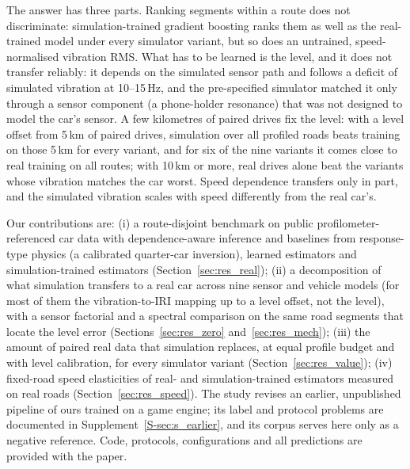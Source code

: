 The answer has three parts.
Ranking segments within a route does not discriminate: simulation-trained gradient boosting ranks them as well as the real-trained model under every simulator variant, but so does an untrained, speed-normalised vibration RMS.
What has to be learned is the level, and it does not transfer reliably: it depends on the simulated sensor path and follows a deficit of simulated vibration at 10--15\,Hz, and the pre-specified simulator matched it only through a sensor component (a phone-holder resonance) that was not designed to model the car's sensor.
A few kilometres of paired drives fix the level: with a level offset from 5\,km of paired drives, simulation over all profiled roads beats training on those 5\,km for every variant, and for six of the nine variants it comes close to real training on all routes; with 10\,km or more, real drives alone beat the variants whose vibration matches the car worst.
Speed dependence transfers only in part, and the simulated vibration scales with speed differently from the real car's.

Our contributions are:
(i) a route-disjoint benchmark on public profilometer-referenced car data with dependence-aware inference and baselines from response-type physics (a calibrated quarter-car inversion), learned estimators and simulation-trained estimators (Section~\ref{sec:res_real});
(ii) a decomposition of what simulation transfers to a real car across nine sensor and vehicle models (for most of them the vibration-to-IRI mapping up to a level offset, not the level), with a sensor factorial and a spectral comparison on the same road segments that locate the level error (Sections~\ref{sec:res_zero} and~\ref{sec:res_mech});
(iii) the amount of paired real data that simulation replaces, at equal profile budget and with level calibration, for every simulator variant (Section~\ref{sec:res_value});
(iv) fixed-road speed elasticities of real- and simulation-trained estimators measured on real roads (Section~\ref{sec:res_speed}).
The study revises an earlier, unpublished pipeline of ours trained on a game engine; its label and protocol problems are documented in Supplement~\ref{S-sec:s_earlier}, and its corpus serves here only as a negative reference.
Code, protocols, configurations and all predictions are provided with the paper.
